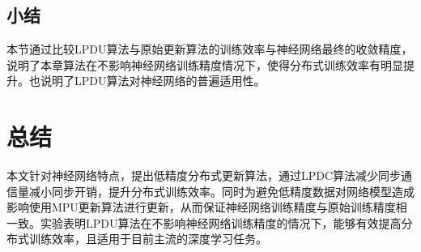 \section{小结}
本节通过比较LPDU算法与原始更新算法的训练效率与神经网络最终的收敛精度，说明了本章算法在不影响神经网络训练精度情况下，使得分布式训练效率有明显提升。也说明了LPDU算法对神经网络的普遍适用性。

\chapter{总结}
本文针对神经网络特点，提出低精度分布式更新算法，通过LPDC算法减少同步通信量减小同步开销，提升分布式训练效率。同时为避免低精度数据对网络模型造成影响使用MPU更新算法进行更新，从而保证神经网络训练精度与原始训练精度相一致。实验表明LPDU算法在不影响神经网络训练精度的情况下，能够有效提高分布式训练效率，且适用于目前主流的深度学习任务。
